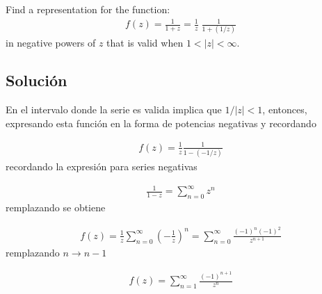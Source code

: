 \begin{problem}{3}
    Find a representation for the function:
    \begin{gather}
        f(z) = \frac{1}{1+z} = \frac{1}{z}\;\frac{1}{1+(1/z)}
    \end{gather}
    in negative powers of $z$ that is valid when $1 < |z| < \infty$.
\end{problem}
\subsection*{Solución}

En el intervalo donde la serie es valida implica que $1/|z| < 1$, entonces, expresando esta función en la forma de potencias negativas y recordando 

\begin{gather*}
    f(z) = \frac{1}{z} \frac{1}{1 - (-1/z)}
\end{gather*}
recordando la expresión para series negativas

\begin{gather*}
    \frac{1}{1-z} = \sum_{n = 0}^{\infty}z^n
\end{gather*}
remplazando se obtiene 

\begin{gather*}
    f(z) = \frac{1}{z}\sum_{n = 0}^{\infty} \left(-\frac{1}{z}\right)^n = \sum_{n = 0}^{\infty}\frac{(-1)^{n}(-1)^2}{z^{n+1}}
\end{gather*}
remplazando $n \rightarrow n-1$

\begin{gather*}
    f(z) = \sum^{\infty}_{n=1}\frac{(-1)^{n+1}}{z^n}
\end{gather*}